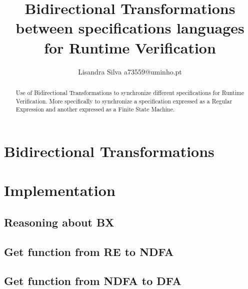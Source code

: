 \documentclass[runningheads]{llncs}
\begin{document}
	\title{Bidirectional Transformations between specifications languages for Runtime Verification}
	\author{Lisandra Silva a73559@uminho.pt}
	\maketitle              %
	
	\begin{abstract}
		Use of Bidirectional Transformations to synchronize different specifications for Runtime Verification. More specifically to synchronize a specification expressed as a Regular Expression and another expressed as a Finite State Machine.
	
	\end{abstract}
	

	\par
	
    
	
    
	
	\section{Bidirectional Transformations}
	
	\section{Implementation}
	\subsection{Reasoning about BX}
	
	\subsection{Get function from RE to NDFA}
	
	\subsection{Get function from NDFA to DFA}
	
\end{document}

